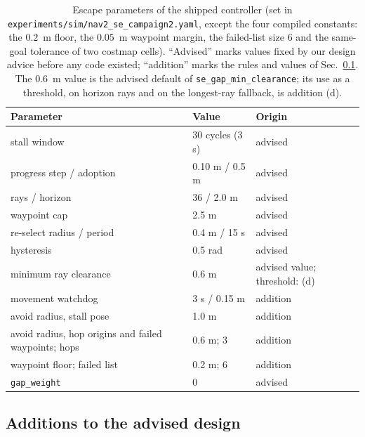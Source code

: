 \documentclass[journal]{IEEEtran}
\begin{document}
\begin{table}[t]
\centering
\caption{Escape parameters of the shipped controller (set in
\texttt{experiments/sim/nav2\_se\_campaign2.yaml}, except the four compiled constants: the
$0.2$~m floor, the $0.05$~m waypoint margin, the failed-list size $6$ and the same-goal
tolerance of two costmap cells). ``Advised'' marks values fixed by
our design advice before any code existed; ``addition'' marks the rules and values of
Sec.~\ref{sec:extras}. The $0.6$~m value is the advised default of
\texttt{se\_gap\_min\_clearance}; its use as a threshold, on horizon rays and on the
longest-ray fallback, is addition (d).}
\label{tab:params}
\footnotesize
\setlength{\tabcolsep}{4pt}
\begin{tabular}{p{}p{}p{}}
\toprule
Parameter & Value & Origin \\
\midrule
stall window & 30 cycles (3 s) & advised \\
progress step / adoption & 0.10 m / 0.5 m & advised \\
rays / horizon & 36 / 2.0 m & advised \\
waypoint cap & 2.5 m & advised \\
re-select radius / period & 0.4 m / 15 s & advised \\
hysteresis & 0.5 rad & advised \\
minimum ray clearance & 0.6 m & advised value; threshold: (d) \\
movement watchdog & 3 s / 0.15 m & addition \\
avoid radius, stall pose & 1.0 m & addition \\
avoid radius, hop origins and failed waypoints; hops & 0.6 m; 3 & addition \\
waypoint floor; failed list & 0.2 m; 6 & addition \\
\texttt{gap\_weight} & 0 & advised \\
\bottomrule
\end{tabular}
\end{table}

\subsection{Additions to the advised design}
\label{sec:extras}
\end{document}
